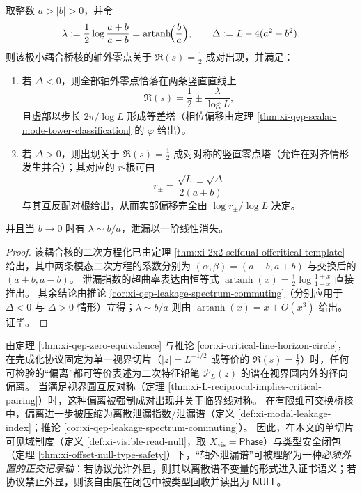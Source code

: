 \begin{corollary}[极小耦合的泄漏指数与零点几何]\label{cor:xi-2x2-coupling-leakage-artanh}
取整数 \(a>|b|>0\)，并令
\[
\lambda:=\frac12\log\frac{a+b}{a-b}=\operatorname{artanh}\!\Bigl(\frac{b}{a}\Bigr),
\qquad
\Delta:=L-4(a^2-b^2).
\]
则该极小耦合桥核的轴外零点关于 \(\Re(s)=\tfrac12\) 成对出现，并满足：
\begin{enumerate}
  \item 若 \(\Delta<0\)，则全部轴外零点恰落在两条竖直直线上
  \[
  \Re(s)=\frac12\pm\frac{\lambda}{\log L},
  \]
  且虚部以步长 \(2\pi/\log L\) 形成等差塔（相位偏移由定理 \ref{thm:xi-qep-scalar-mode-tower-classification} 的 \(\varphi\) 给出）。
  \item 若 \(\Delta>0\)，则出现关于 \(\Re(s)=\tfrac12\) 成对对称的竖直零点塔（允许在对齐情形发生并合）；其对应的 \(r\)-根可由
  \[
  r_{\pm}=\frac{\sqrt L\pm\sqrt{\Delta}}{2(a+b)}
  \]
  与其互反配对根给出，从而实部偏移完全由 \(\log r_{\pm}/\log L\) 决定。
\end{enumerate}
并且当 \(b\to 0\) 时有 \(\lambda\sim b/a\)，泄漏以一阶线性消失。
\end{corollary}

\begin{proof}
该耦合核的二次方程化已由定理 \ref{thm:xi-2x2-selfdual-offcritical-template} 给出，其中两条模态二次方程的系数分别为 \((\alpha,\beta)=(a-b,a+b)\) 与交换后的 \((a+b,a-b)\)。
泄漏指数的超曲率表达由恒等式
\(
\operatorname{artanh}(x)=\tfrac12\log\frac{1+x}{1-x}
\)
直接推出。
其余结论由推论 \ref{cor:xi-qep-leakage-spectrum-commuting}（分别应用于 \(\Delta<0\) 与 \(\Delta>0\) 情形）立得；\(\lambda\sim b/a\) 则由 \(\operatorname{artanh}(x)=x+O(x^3)\) 给出。证毕。
\end{proof}

\begin{remark}\label{rem:xi-qep-leakage-conceptual}
由定理 \ref{thm:xi-qep-zero-equivalence} 与推论 \ref{cor:xi-critical-line-horizon-circle}，在完成化协议固定为单一视界切片（\(|z|=L^{-1/2}\) 或等价的 \(\Re(s)=\tfrac12\)）时，任何可检验的“偏离”都可等价表述为二次特征铅笔 \(\mathcal{P}_L(z)\) 的谱在视界圆内外的径向偏离。
当满足视界圆互反对称（定理 \ref{thm:xi-L-reciprocal-implies-critical-pairing}）时，这种偏离被强制成对出现并关于临界线对称。
在有限维可交换桥核中，偏离进一步被压缩为离散泄漏指数/泄漏谱（定义 \ref{def:xi-modal-leakage-index}；推论 \ref{cor:xi-qep-leakage-spectrum-commuting}）。
因此，在本文的单切片可见域制度（定义 \ref{def:xi-visible-read-null}，取 \(X_{\mathrm{vis}}=\mathsf{Phase}\)）与类型安全闭包（定理 \ref{thm:xi-offset-null-type-safety}）下，“轴外泄漏谱”可被理解为一种\emph{必须外置的正交记录轴}：若协议允许外显，则其以离散谱不变量的形式进入证书语义；若协议禁止外显，则该自由度在闭包中被类型回收并读出为 \(\mathsf{NULL}\)。
\end{remark}

\endinput
